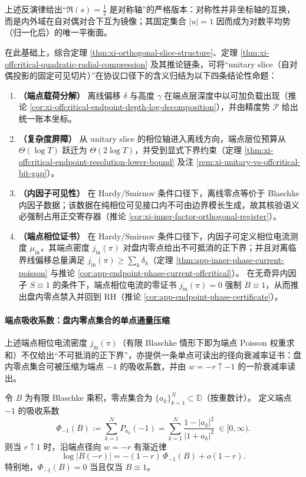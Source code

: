 上述反演律给出“\(\Re(s)=\tfrac12\) 是对称轴”的严格版本：对称性并非坐标轴的互换，而是内外域在自对偶对合下互为镜像；其固定集合 \(|u|=1\) 因而成为对数平均势（归一化后）的唯一平衡面。
\par
在此基础上，综合定理 \ref{thm:xi-orthogonal-slice-structure}、定理 \ref{thm:xi-offcritical-quadratic-radial-compression} 及其推论链条，可将“unitary slice（自对偶投影的固定可见切片）”在协议口径下的含义归结为以下四条结论性命题：
\begin{enumerate}
  \item \textbf{（端点载荷分解）}
  离线偏移 \(\delta\) 与高度 \(\gamma\) 在端点层深度中以可加负载出现（推论 \ref{cor:xi-offcritical-endpoint-depth-log-decomposition}），并由精度势 \(\mathcal{P}\) 给出统一账本坐标。
  \item \textbf{（复杂度屏障）}
  从 unitary slice 的相位轴进入离线方向，端点层位预算从 \(\Theta(\log T)\) 跃迁为 \(\Theta(2\log T)\)，并受到显式下界约束（定理 \ref{thm:xi-offcritical-endpoint-resolution-lower-bound} 及注 \ref{rem:xi-unitary-vs-offcritical-bit-gap}）。
  \item \textbf{（内因子可见性）}
  在 Hardy/Smirnov 条件口径下，离线零点等价于 Blaschke 内因子数据；该数据在纯相位可见接口内不可由边界模长生成，故其核验语义必强制占用正交寄存器（推论 \ref{cor:xi-inner-factor-orthogonal-register}）。
  \item \textbf{（端点相位证书）}
  在 Hardy/Smirnov 条件口径下，内因子可定义相位电流测度 \(\mu_{\mathrm{in}}\)，其端点密度 \(j_{\mathrm{in}}(\pi)\) 对盘内零点给出不可抵消的正下界；并且对离临界线偏移总量满足 \(j_{\mathrm{in}}(\pi)\ge \sum_k\delta_k\)（定理 \ref{thm:app-inner-phase-current-poisson} 与推论 \ref{cor:app-endpoint-phase-current-offcritical}）。
  在无奇异内因子 \(S\equiv 1\) 的条件下，端点相位电流的零证书 \(j_{\mathrm{in}}(\pi)=0\) 强制 \(B\equiv 1\)，从而推出盘内零点禁入并回到 RH（推论 \ref{cor:app-endpoint-phase-certificate}）。
\end{enumerate}
\par
\paragraph{端点吸收系数：盘内零点集合的单点通量压缩}
上述端点相位电流密度 \(j_{\mathrm{in}}(\pi)\)（有限 Blaschke 情形下即为端点 Poisson 权重求和）不仅给出“不可抵消的正下界”，亦提供一条单点可读出的径向衰减率证书：盘内零点集合可被压缩为端点 \(-1\) 的吸收系数，并由 \(w=-r\uparrow-1\) 的一阶衰减率读出。

\begin{proposition}[端点吸收系数与径向吸收律]\label{prop:xi-endpoint-absorption-coefficient}
令 \(B\) 为有限 Blaschke 乘积，零点集合为 \(\{a_k\}_{k=1}^{N}\subset\mathbb{D}\)（按重数计）。
定义端点 \(-1\) 的吸收系数
\[
\Phi_{-1}(B):=\sum_{k=1}^{N}P_{a_k}(-1)=\sum_{k=1}^{N}\frac{1-|a_k|^2}{|1+a_k|^2}\ \in[0,\infty).
\]
则当 \(r\uparrow 1\) 时，沿端点径向 \(w=-r\) 有渐近律
\[
\log|B(-r)|=-(1-r)\,\Phi_{-1}(B)+o(1-r).
\]
特别地，\(\Phi_{-1}(B)=0\) 当且仅当 \(B\equiv 1\)。
\end{proposition}

